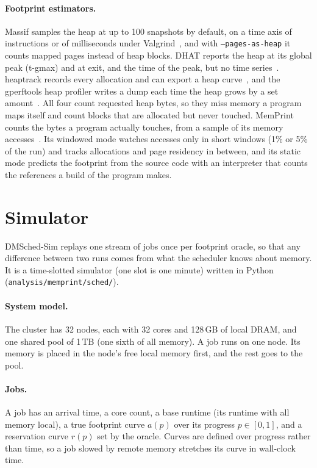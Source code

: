 \documentclass[11pt]{article}
\newcommand{\memprint}{MemPrint}
\begin{document}
\paragraph{Footprint estimators.} Massif samples the heap at up to 100 snapshots by default, on a time axis of
instructions or of milliseconds under Valgrind~\cite{ValgrindMassif}, and with \texttt{--pages-as-heap} it
counts mapped pages instead of heap blocks. DHAT reports the heap at its global peak (t-gmax) and at exit, and
the time of the peak, but no time series~\cite{ValgrindDHAT}. heaptrack records every allocation and can
export a heap curve~\cite{heaptrack}, and the gperftools heap profiler writes a dump each time the heap grows
by a set amount~\cite{gperftools}. All four count requested heap bytes, so they miss memory a program maps
itself and count blocks that are allocated but never touched. \memprint{} counts the bytes a program actually
touches, from a sample of its memory accesses~\cite{memprint}. Its windowed mode watches accesses only in
short windows (1\% or 5\% of the run) and tracks allocations and page residency in between, and its static
mode predicts the footprint from the source code with an interpreter that counts the references a build of
the program makes.

\section{Simulator}
\label{sec:sim}

DMSched-Sim replays one stream of jobs once per footprint oracle, so that any difference between two runs
comes from what the scheduler knows about memory. It is a time-slotted simulator (one slot is one minute)
written in Python (\texttt{analysis/memprint/sched/}).

\paragraph{System model.} The cluster has 32 nodes, each with 32 cores and 128\,GB of local DRAM, and one
shared pool of 1\,TB (one sixth of all memory). A job runs on one node. Its memory is placed in the node's
free local memory first, and the rest goes to the pool.

\paragraph{Jobs.} A job has an arrival time, a core count, a base runtime (its runtime with all memory
local), a true footprint curve $a(p)$ over its progress $p \in [0, 1]$, and a reservation curve $r(p)$ set by
the oracle. Curves are defined over progress rather than time, so a job slowed by remote memory stretches its
curve in wall-clock time.
\end{document}
